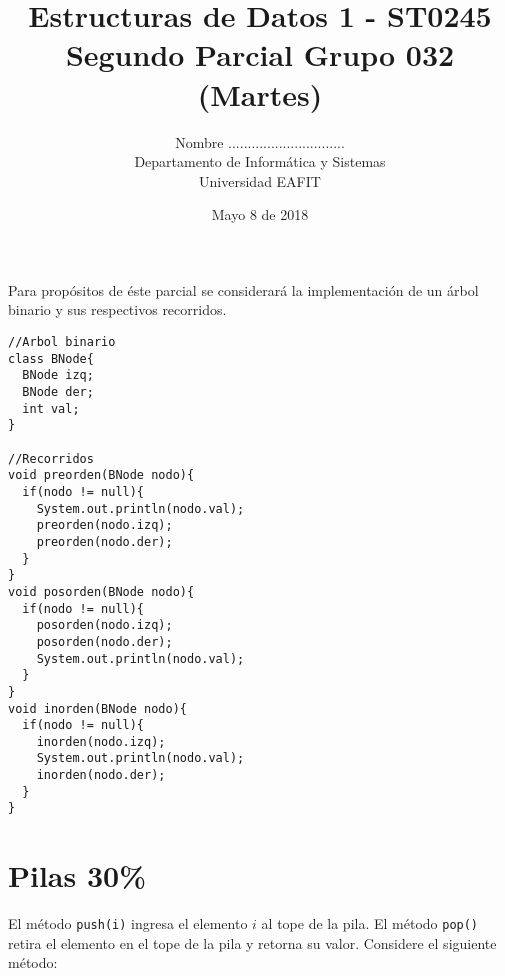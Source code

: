 \documentclass[10 pt]{article}
\title{\textbf {Estructuras de Datos 1 - ST0245\\Segundo Parcial Grupo 032 (Martes)}}
\author{Nombre ..............................\\
		Departamento de Informática y Sistemas\\
		Universidad EAFIT\\}
\date{Mayo 8 de 2018}
\begin{document}
\lstset{escapechar=@,style=customc, numbers=left, stepnumber = 1} 
\maketitle
\begin{multicols}{2}
Para propósitos de éste parcial se considerará la implementación de un árbol binario y sus respectivos recorridos.
\begin{lstlisting}
//Arbol binario
class BNode{
  BNode izq;
  BNode der;
  int val;
}

//Recorridos
void preorden(BNode nodo){
  if(nodo != null){
    System.out.println(nodo.val);
    preorden(nodo.izq);
    preorden(nodo.der);  
  }
}
void posorden(BNode nodo){
  if(nodo != null){
    posorden(nodo.izq);
    posorden(nodo.der);
    System.out.println(nodo.val);  
  }
}
void inorden(BNode nodo){
  if(nodo != null){
    inorden(nodo.izq);
    System.out.println(nodo.val);
    inorden(nodo.der);  
  }
}

\end{lstlisting}
\section{Pilas 30\%}
El método \texttt{push(i)} ingresa el elemento $i$ al tope de la pila. El método \texttt{pop()} retira
el elemento en el tope de la pila y retorna su valor. Considere el siguiente método:


\end{multicols}
\end{document}
